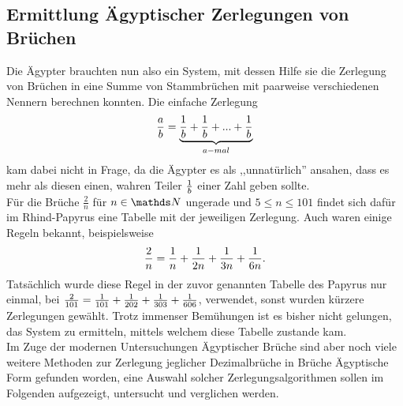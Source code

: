 \subsection{Ermittlung Ägyptischer Zerlegungen von Brüchen}
Die Ägypter brauchten nun also ein System, mit dessen Hilfe sie die Zerlegung von Brüchen in eine Summe von Stammbrüchen mit paarweise verschiedenen Nennern berechnen konnten. Die einfache Zerlegung
$$\frac{a}{b} = \underbrace{\frac{1}{b} + \frac{1}{b} + ... +\frac{1}{b}}_{a-mal}$$
kam dabei nicht in Frage, da die Ägypter es als ,,unnatürlich'' ansahen, dass es mehr als diesen einen, wahren Teiler $\frac{1}{b}$ einer Zahl geben sollte. \cite[S.39]{Burton2011}\\
Für die Brüche $\frac{2}{n}$ für $n \in \N$ ungerade und $5 \leq n \leq 101$ findet sich dafür im Rhind-Papyrus eine Tabelle mit der jeweiligen Zerlegung. Auch waren einige Regeln bekannt, beispielsweise
$$\frac{2}{n} = \frac{1}{n} + \frac{1}{2n} + \frac{1}{3n} +\frac{1}{6n}.$$
Tatsächlich wurde diese Regel in der zuvor genannten Tabelle des Papyrus nur einmal, bei $\frac{2}{101} = \frac{1}{101}+\frac{1}{202}+\frac{1}{303}+\frac{1}{606}$, verwendet, sonst wurden kürzere Zerlegungen gewählt. Trotz immenser Bemühungen ist es bisher nicht gelungen, das System zu ermitteln, mittels welchem diese Tabelle zustande kam. \cite[S. 41]{Burton2011}\\
Im Zuge der modernen Untersuchungen Ägyptischer Brüche sind aber noch viele weitere Methoden zur Zerlegung jeglicher Dezimalbrüche in Brüche Ägyptische Form gefunden worden, eine Auswahl solcher Zerlegungsalgorithmen sollen im Folgenden aufgezeigt, untersucht und verglichen werden.